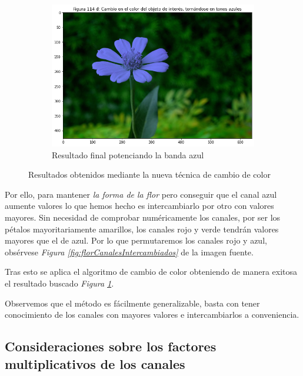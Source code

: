 \documentclass[11pt,twoside,titlepage,a4paper]{article}
\numberwithin{equation}{section} %
\theoremstyle{usual}
\begin{document}
\begin{figure}[h]
    \label{fig:resultadosPotenciacionBandas}
    \centering
    \begin{subfigure}[t]{.45\textwidth}
        \centering
        \includegraphics[width=\textwidth]{imagenes/PoissonImageEditing_cell_115_output_2.png}
        \caption{Resultado final potenciando la banda azul}
        \label{fig:bandaAzulFlorFin}%
    \end{subfigure}
    \caption{Resultados obtenidos mediante la nueva técnica de cambio de color}
    \label{fig:resultadosNuevaTecnicaCambiosColor}
\end{figure}

Por ello, para mantener \textit{la forma de la flor} pero conseguir que el canal azul aumente valores lo que hemos hecho es intercambiarlo por otro con valores mayores. Sin necesidad de comprobar numéricamente los canales, por ser los pétalos mayoritariamente amarillos, los canales rojo y verde tendrán valores mayores que el de azul. Por lo que  permutaremos los canales rojo y azul, obsérvese \textit{Figura \ref{fig:florCanalesIntercambiados}} de la imagen fuente. 

Tras esto se aplica el algoritmo de cambio de color obteniendo de manera exitosa el resultado buscado \textit{Figura \ref{fig:bandaAzulFlorFin}}. 

Observemos que el método es fácilmente generalizable, basta con tener conocimiento de los canales con mayores valores e intercambiarlos a conveniencia.

\subsection{Consideraciones sobre los factores multiplicativos de los canales}
\end{document}
